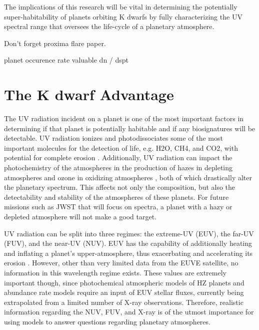 \documentclass[preprint2]{aastex62}
\begin{document}
The implications of this research will be vital in determining the potentially super-habitability of planets orbiting K dwarfs by fully characterizing the UV spectral range that oversees the life-cycle of a planetary atmosphere.

Don't forget proxima flare paper.


planet occurence rate valuable
dn / dspt

\section{The K dwarf Advantage}\label{sec:advantage}

The UV radiation incident on a planet is one of the most important factors in determining if that planet is potentially habitable and if any biosignatures will be detectable. UV radiation ionizes and photodissociates some of the most important molecules for the detection of life, e.g. H2O, CH4, and CO2, with potential for complete erosion \citep[e.g.][]{Kasting1993, Lichtenegger2010, Segura2010, Hu2012}. Additionally, UV radiation can impact the photochemistry of the atmospheres in the production of hazes in depleting atmospheres \citep{Zerkle2012, Arney2017}
and ozone in oxidizing atmospheres \citep{Segura2003, Segura2005}, both of which drastically alter the planetary spectrum. This affects not only the composition, but also the detectability and stability of the atmospheres of these planets. For future missions such as JWST that will focus on spectra, a planet with a hazy or depleted atmosphere will not make a good target.

UV radiation can be split into three regimes: the extreme-UV (EUV), the far-UV (FUV), and the near-UV (NUV). EUV has the capability of additionally heating and inflating a planet’s upper-atmosphere, thus exacerbating and accelerating its erosion \citep{Koskinen2010, Lammer2007}. However, other than very limited data from the EUVE satellite, no information in this wavelength regime exists. These values are extremely important though, since photochemical atmospheric models of HZ planets and abundance rate models require an input of EUV stellar fluxes, currently being extrapolated from a limited number of X-ray observations. Therefore, realistic information regarding the NUV, FUV, and X-ray is of the utmost importance for using models to answer questions regarding planetary atmospheres. 
\end{document}
